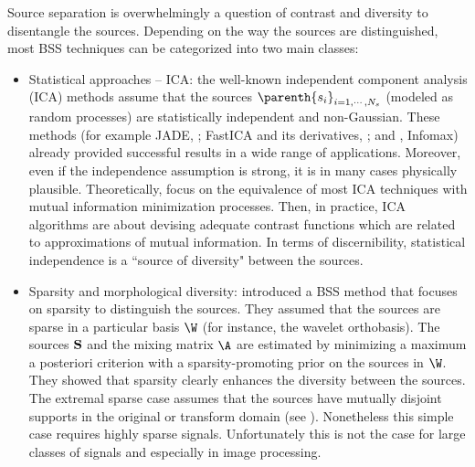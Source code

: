 
Source separation is overwhelmingly a question of contrast and diversity to disentangle the sources. Depending on the way the sources are distinguished, most BSS techniques can be categorized into two main classes:
\begin{itemize}
\item{Statistical approaches -- ICA:} the well-known independent component analysis (ICA) methods assume that the sources $\parenth{s_i}_{i=1,\cdots,N_s}$ (modeled as random processes) are statistically independent and non-Gaussian. These methods (for example JADE, \citet{ica:jade}; FastICA and its derivatives, \citet{miki:Aapo}; and \citet{koldo06}, Infomax) already provided successful results in a wide range of applications. Moreover, even if the independence assumption is strong, it is in many cases physically plausible. Theoretically, \citet{lee98unifying} focus on the equivalence of most ICA techniques with mutual information minimization processes. Then, in practice, ICA algorithms are about devising adequate contrast functions which are related to approximations of mutual information. In terms of discernibility, statistical independence is a ``source of diversity" between the sources.
\item{{Sparsity and morphological diversity:}}   \citet{ica:zibu_pearl} introduced a  BSS method that focuses on sparsity to distinguish the sources.
 They assumed that the sources are sparse in a particular basis $\W$ (for instance, the wavelet orthobasis). The sources $\bf S$ and the mixing matrix $\A$ are estimated by minimizing a maximum a posteriori criterion with a sparsity-promoting prior on the sources in $\W$. They showed that sparsity clearly enhances the diversity between the sources. The extremal sparse case assumes that the sources have mutually disjoint supports in the original or transform domain (see \citep{JRY00,ica:cicho06_1}). Nonetheless this simple case requires highly sparse signals. Unfortunately this is not the case for large classes of signals and especially in image processing.
\end{itemize}

